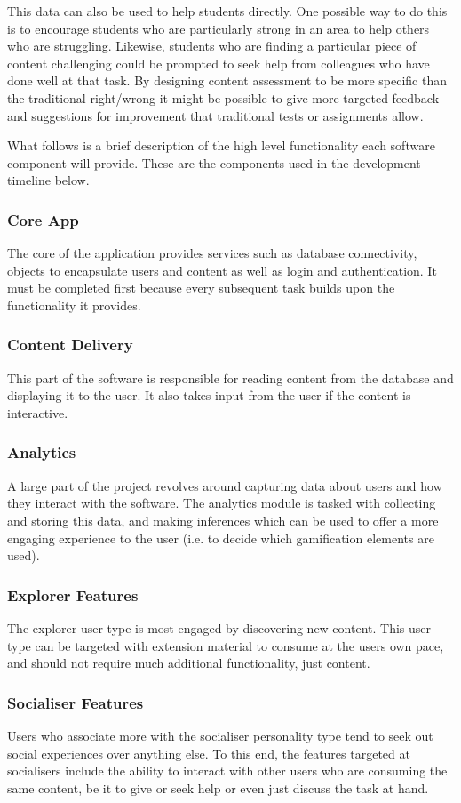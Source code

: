 This data can also be used to help students directly. One possible way to do this is to encourage students who are particularly strong in an area to help others who are struggling. Likewise, students who are finding a particular piece of content challenging could be prompted to seek help from colleagues who have done well at that task. By designing content assessment to be more specific than the traditional right/wrong it might be possible to give more targeted feedback and suggestions for improvement that traditional tests or assignments allow.

What follows is a brief description of the high level functionality each software component will provide. These are the components used in the development timeline below.

\subsubsection*{Core App}
The core of the application provides services such as database connectivity, objects to encapsulate users and content as well as login and authentication. It must be completed first because every subsequent task builds upon the functionality it provides.
\subsubsection*{Content Delivery}
This part of the software is responsible for reading content from the database and displaying it to the user. It also takes input from the user if the content is interactive.
\subsubsection*{Analytics}
A large part of the project revolves around capturing data about users and how they interact with the software. The analytics module is tasked with collecting and storing this data, and making inferences which can be used to offer a more engaging experience to the user (i.e. to decide which gamification elements are used).
\subsubsection*{Explorer Features}
The explorer user type is most engaged by discovering new content. This user type can be targeted with extension material to consume at the users own pace, and should not require much additional functionality, just content.
\subsubsection*{Socialiser Features}
Users who associate more with the socialiser personality type tend to seek out social experiences over anything else. To this end, the features targeted at socialisers include the ability to interact with other users who are consuming the same content, be it to give or seek help or even just discuss the task at hand.
